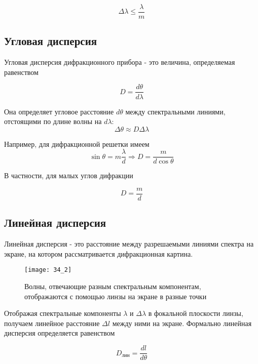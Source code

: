 \begin{equation*}
    \Delta \lambda \leq \frac{\lambda}{m}
\end{equation*}
\subsection{Угловая дисперсия}

Угловая дисперсия дифракционного прибора - это величина, определяемая равенством

\begin{equation*}
    D = \frac{d\theta}{d\lambda}
\end{equation*}

Она определяет угловое расстояние $d\theta$ между спектральными линиями, отстоящими по длине волны на $d\lambda$:
\begin{equation*}
   \Delta \theta \approx D \Delta \lambda
\end{equation*}

Например, для дифракционной решетки имеем
\begin{equation*}
    \sin \theta = m\frac{\lambda}{d}  \Rightarrow D = \frac{m}{d\cos\theta}
\end{equation*}

В частности, для малых углов дифракции

\begin{equation*}
    D = \frac{m}{d}
\end{equation*}

\subsection{Линейная дисперсия}

Линейная дисперсия - это расстояние между разрешаемыми линиями спектра на экране, на котором рассматривается дифракционная картина. 

\begin{figure}[h!]
    \centering
    \texttt{[image: 34\_2]}
    \caption{Волны, отвечающие разным спектральным компонентам, отображаются с помощью линзы на экране в разные точки}
    \label{fig:my_label}
\end{figure} 


Отображая спектральные компоненты $\lambda$ и $\Delta \lambda$ в фокальной плоскости линзы, получаем линейное расстояние $\Delta l$ между ними на экране. Формально линейная дисперсия определяется равенством

\begin{equation*}
    D_{\text{лин}} = \frac{dl}{d\theta}
\end{equation*}

